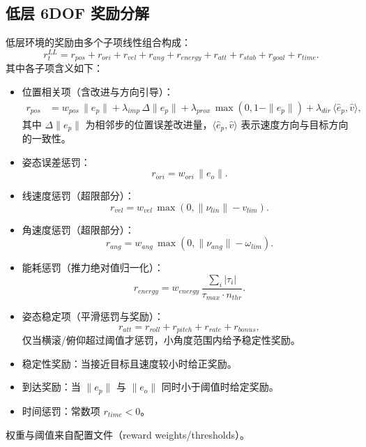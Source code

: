 \documentclass[11pt]{article}
\begin{document}
\subsection{低层 6DOF 奖励分解}
低层环境的奖励由多个子项线性组合构成：
\begin{equation}
 r_t^{LL} = r_{pos} + r_{ori} + r_{vel} + r_{ang} + r_{energy} + r_{att} + r_{stab} + r_{goal} + r_{time}.
\end{equation}
其中各子项含义如下：
\begin{itemize}
  \item 位置相关项（含改进与方向引导）：
  \begin{align}
   r_{pos} &= w_{pos}\,\|e_p\| 
   + \lambda_{imp}\,\Delta\|e_p\| 
   + \lambda_{prox}\,\max(0, 1-\|e_p\|) 
   + \lambda_{dir}\,\langle \hat{e}_p, \hat{v}\rangle,
  \end{align}
  其中 $\Delta\|e_p\|$ 为相邻步的位置误差改进量，$\langle \hat{e}_p, \hat{v}\rangle$ 表示速度方向与目标方向的一致性。
  \item 姿态误差惩罚：
  \begin{equation}
   r_{ori} = w_{ori}\,\|e_o\|.
  \end{equation}
  \item 线速度惩罚（超限部分）：
  \begin{equation}
   r_{vel} = w_{vel}\,\max(0, \|\nu_{lin}\| - v_{lim}).
  \end{equation}
  \item 角速度惩罚（超限部分）：
  \begin{equation}
   r_{ang} = w_{ang}\,\max(0, \|\nu_{ang}\| - \omega_{lim}).
  \end{equation}
  \item 能耗惩罚（推力绝对值归一化）：
  \begin{equation}
   r_{energy} = w_{energy}\,\frac{\sum_i |\tau_i|}{\tau_{max} \cdot n_{thr}}.
  \end{equation}
  \item 姿态稳定项（平滑惩罚与奖励）：
  \begin{equation}
   r_{att} = r_{roll} + r_{pitch} + r_{rate} + r_{bonus},
  \end{equation}
  仅当横滚/俯仰超过阈值才惩罚，小角度范围内给予稳定性奖励。
  \item 稳定性奖励：当接近目标且速度较小时给正奖励。
  \item 到达奖励：当 $\|e_p\|$ 与 $\|e_o\|$ 同时小于阈值时给定奖励。
  \item 时间惩罚：常数项 $r_{time}<0$。
\end{itemize}
权重与阈值来自配置文件（reward weights/thresholds）。
\end{document}
